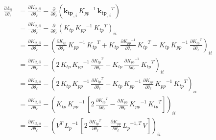 \documentclass[11pt,a4paper]{article}
\numberwithin{equation}{section}
\begin{document}
\begin{align}
\frac{\partial \Lambda_{ii}}{\partial \theta_\ell}
  &= \frac{\partial K_{tt,ii}}{\partial \theta_\ell} - \frac{\partial}{\partial \theta_\ell}\left(\mathbf{k_{tp}}_{,i}\,{K_{pp}}^{-1}\,{\mathbf{k_{tp}}_{,i}}^T\right) \\
  &= \frac{\partial K_{tt,ii}}{\partial \theta_\ell} - \frac{\partial}{\partial \theta_\ell}\left(K_{tp}\,{K_{pp}}^{-1}\,{K_{tp}}^T\right)_{ii} \\
  &= \frac{\partial K_{tt,ii}}{\partial \theta_\ell} - \left(\frac{\partial K_{tp}}{\partial \theta_\ell}\,{K_{pp}}^{-1}\,{K_{tp}}^T + K_{tp}\,\frac{\partial {K_{pp}}^{-1}}{\partial \theta_\ell}\,{K_{tp}}^T + K_{tp}\,{K_{pp}}^{-1}\,\frac{\partial {K_{tp}}^T}{\partial \theta_\ell}\right)_{ii} \\
  &= \frac{\partial K_{tt,ii}}{\partial \theta_\ell} - \left(2\,K_{tp}\,{K_{pp}}^{-1}\,\frac{\partial {K_{tp}}^T}{\partial \theta_\ell} + K_{tp}\,\frac{\partial {K_{pp}}^{-1}}{\partial \theta_\ell}\,{K_{tp}}^T\right)_{ii} \\
  &= \frac{\partial K_{tt,ii}}{\partial \theta_\ell} - \left(2\,K_{tp}\,{K_{pp}}^{-1}\,\frac{\partial {K_{tp}}^T}{\partial \theta_\ell} - K_{tp}\,{K_{pp}}^{-1}\,\frac{\partial K_{pp}}{\partial \theta_\ell}\,{K_{pp}}^{-1}\,{K_{tp}}^T\right)_{ii} \\
  &= \frac{\partial K_{tt,ii}}{\partial \theta_\ell} - \left(K_{tp}\,{K_{pp}}^{-1}\,\left[2\,\frac{\partial {K_{tp}}^T}{\partial \theta_\ell} - \frac{\partial K_{pp}}{\partial \theta_\ell}\,{K_{pp}}^{-1}\,{K_{tp}}^T\right]\right)_{ii} \\
  &= \frac{\partial K_{tt,ii}}{\partial \theta_\ell} - \left(V^T\,{L_p}^{-1}\,\left[2\,\frac{\partial {K_{tp}}^T}{\partial \theta_\ell} - \frac{\partial K_{pp}}{\partial \theta_\ell}\,{L_{p}}^{-1,T}\,V\right]\right)_{ii}
\end{align}
\end{document}
